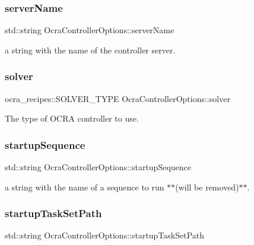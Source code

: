 \subsubsection{\texorpdfstring{server\+Name}{serverName}}
{\footnotesize\ttfamily std\+::string Ocra\+Controller\+Options\+::server\+Name}

a string with the name of the controller server. \hypertarget{classOcraControllerOptions_af79b8705c3f3097b642262bc877eaa8e}{}\label{classOcraControllerOptions_af79b8705c3f3097b642262bc877eaa8e} 
\subsubsection{\texorpdfstring{solver}{solver}}
{\footnotesize\ttfamily ocra\+\_\+recipes\+::\+S\+O\+L\+V\+E\+R\+\_\+\+T\+Y\+PE Ocra\+Controller\+Options\+::solver}

The type of O\+C\+RA controller to use. \hypertarget{classOcraControllerOptions_ab01efbd786ad8bc5beb6de02dbcd0936}{}\label{classOcraControllerOptions_ab01efbd786ad8bc5beb6de02dbcd0936} 
\subsubsection{\texorpdfstring{startup\+Sequence}{startupSequence}}
{\footnotesize\ttfamily std\+::string Ocra\+Controller\+Options\+::startup\+Sequence}

a string with the name of a sequence to run $\ast$$\ast$(will be removed)$\ast$$\ast$. \hypertarget{classOcraControllerOptions_af91566ecff3f7ed02571369c7af061ce}{}\label{classOcraControllerOptions_af91566ecff3f7ed02571369c7af061ce} 
\subsubsection{\texorpdfstring{startup\+Task\+Set\+Path}{startupTaskSetPath}}
{\footnotesize\ttfamily std\+::string Ocra\+Controller\+Options\+::startup\+Task\+Set\+Path}

